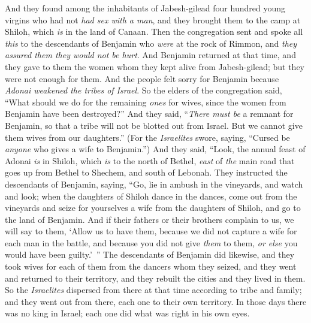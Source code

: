 \begin{biblechapter}
\verse And they found among the inhabitants of Jabesh-gilead four hundred young virgins who had not \textit{had sex with a man}, and they brought them to the camp at Shiloh, which \textit{is} in the land of Canaan.
\verse Then the congregation sent and spoke all \textit{this} to the descendants of Benjamin who \textit{were} at the rock of Rimmon, and \textit{they assured them they would not be hurt}.
\verse And Benjamin returned at that time, and they gave to them the women whom they kept alive from Jabesh-gilead; but they were not enough for them.
\verse And the people felt sorry for Benjamin because \textit{Adonai weakened the tribes of Israel}.
\verse So the elders of the congregation said, “What should we do for the remaining \textit{ones} for wives, since the women from Benjamin have been destroyed?”
\verse And they said, “\textit{There must be} a remnant for Benjamin, so that a tribe will not be blotted out from Israel.
\verse But we cannot give them wives from our daughters.” (For the \textit{Israelites} swore, saying, “Cursed be \textit{anyone} who gives a wife to Benjamin.”)
\verse And they said, “Look, the annual feast of Adonai \textit{is} in Shiloh, which \textit{is} to the north of Bethel, \textit{east} of \textit{the} main road that goes up from Bethel to Shechem, and south of Lebonah.
\verse They instructed the descendants of Benjamin, saying, “Go, lie in ambush in the vineyards,
\verse and watch and look; when the daughters of Shiloh dance in the dances, come out from the vineyards and seize for yourselves a wife from the daughters of Shiloh, and go to the land of Benjamin.
\verse And if their fathers or their brothers complain to us, we will say to them, ‘Allow us to have them, because we did not capture a wife for each man in the battle, and because you did not give \textit{them} to them, \textit{or else} you would have been guilty.’ ”
\verse The descendants of Benjamin did likewise, and they took wives for each of them from the dancers whom they seized, and they went and returned to their territory, and they rebuilt the cities and they lived in them.
\verse So the \textit{Israelites} dispersed from there at that time according to tribe and family; and they went out from there, each one to their own territory.
\verse In those days there was no king in Israel; each one did what was right in his own eyes.
\end{biblechapter}

